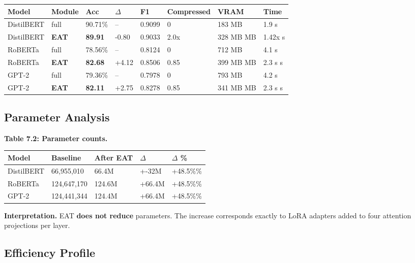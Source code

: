 \begin{table}[H]
\centering
\small
\begin{tabular}{llllllll}
\toprule
\textbf{Model} & \textbf{Module} & \textbf{Acc} & \textbf{$\Delta$} & \textbf{F1} & \textbf{Compressed} & \textbf{VRAM} & \textbf{Time} \\
\midrule
DistilBERT & full & 90.71\% & -- & 0.9099 & 0 & 183 MB & 1.9 s \\
DistilBERT & \textbf{EAT} & \textbf{89.91} & -0.80 & 0.9033 & 2.0x & 328 MB MB & 1.42x s \\
RoBERTa & full & 78.56\% & -- & 0.8124 & 0 & 712 MB & 4.1 s \\
RoBERTa & \textbf{EAT} & \textbf{82.68} & +4.12 & 0.8506 & 0.85 & 399 MB MB & 2.3 s s \\
GPT-2 & full & 79.36\% & -- & 0.7978 & 0 & 793 MB & 4.2 s \\
GPT-2 & \textbf{EAT} & \textbf{82.11} & +2.75 & 0.8278 & 0.85 & 341 MB MB & 2.3 s s \\
\bottomrule
\end{tabular}
\end{table}

\subsection{Parameter Analysis}

\textbf{Table 7.2: Parameter counts.}

\begin{table}[H]
\centering
\small
\begin{tabular}{lllll}
\toprule
\textbf{Model} & \textbf{Baseline} & \textbf{After EAT} & \textbf{$\Delta$} & \textbf{$\Delta$ \%} \\
\midrule
DistilBERT & 66,955,010 & 66.4M & +-32M & +48.5\%\% \\
RoBERTa & 124,647,170 & 124.6M & +66.4M & +48.5\%\% \\
GPT-2 & 124,441,344 & 124.4M & +66.4M & +48.5\%\% \\
\bottomrule
\end{tabular}
\end{table}

\textbf{Interpretation.} EAT \textbf{does not reduce} parameters. The increase 
corresponds exactly to LoRA adapters added to four attention projections 
per layer.

\subsection{Efficiency Profile}

